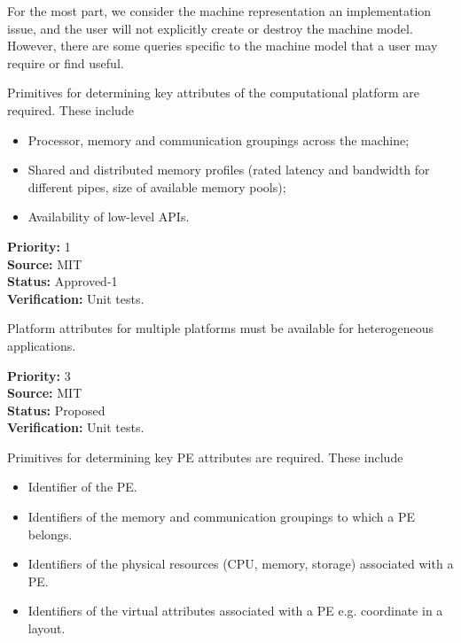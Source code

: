 

For the most part, we consider the machine representation an implementation issue,
and the user will not explicitly create or destroy the machine model.
However, there are some queries specific to the machine model that a user may 
require or find useful.


Primitives for determining key attributes of the computational
platform are required.
These include
\begin{itemize}
\item Processor, memory and communication groupings across the machine;
\item Shared and distributed memory profiles (rated latency and
  bandwidth for different pipes, size of available memory pools);
\item Availability of low-level APIs.
\end{itemize}

\begin{reqlist}
{\bf Priority:} 1 \\
{\bf Source:} MIT \\
{\bf Status:} Approved-1 \\
{\bf Verification:} Unit tests. \\
\end{reqlist}


Platform attributes for multiple platforms must be available for
heterogeneous applications.

\begin{reqlist}
{\bf Priority:} 3 \\
{\bf Source:} MIT \\
{\bf Status:} Proposed \\
{\bf Verification:} Unit tests. \\
\end{reqlist}


Primitives for determining key PE attributes are required.
These include
\begin{itemize}
\item Identifier of the PE.
\item Identifiers of the memory and communication groupings to which a 
PE belongs.
\item Identifiers of the physical resources (CPU, memory, storage) associated with a PE.
\item Identifiers of the virtual attributes associated with a PE e.g. coordinate in a layout.
\end{itemize}

